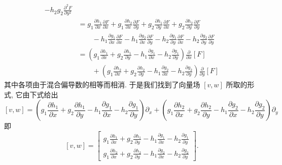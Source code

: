 \begin{align*}
-h_2g_2\frac{\partial^2 F}{\partial y^2}\\
&=g_1\frac{\partial h_1}{\partial x}\frac{\partial F}{\partial x}
+g_1\frac{\partial h_2}{\partial x}\frac{\partial F}{\partial y}
+g_2\frac{\partial h_1}{\partial y}\frac{\partial F}{\partial x}
+g_2\frac{\partial h_2}{\partial y}\frac{\partial F}{\partial y}\\
&\qquad-h_1\frac{\partial g_1}{\partial x}\frac{\partial F}{\partial x}
-h_1\frac{\partial g_2}{\partial x}\frac{\partial F}{\partial y}
-h_2\frac{\partial g_1}{\partial y}\frac{\partial F}{\partial x}
-h_2\frac{\partial g_2}{\partial y}\frac{\partial F}{\partial y}\\
&=\left(g_1\frac{\partial h_1}{\partial x}+g_2\frac{\partial h_1}{\partial y}
-h_1\frac{\partial g_1}{\partial x}-h_2\frac{\partial g_1}{\partial y}\right)\frac{\partial}{\partial x}[F]\\
&\qquad+\left(g_1\frac{\partial h_2}{\partial x}+g_2\frac{\partial h_2}{\partial y}
-h_1\frac{\partial g_2}{\partial x}-h_2\frac{\partial g_2}{\partial y}\right)\frac{\partial}{\partial y}[F]
\end{align*}
其中各项由于混合偏导数的相等而相消. 于是我们找到了向量场 $[v,w]$ 所取的形式, 它由下式给出
\[
[v,w]=\left(g_1\frac{\partial h_1}{\partial x}+g_2\frac{\partial h_1}{\partial y}
-h_1\frac{\partial g_1}{\partial x}-h_2\frac{\partial g_1}{\partial y}\right)\partial_x
+\left(g_1\frac{\partial h_2}{\partial x}+g_2\frac{\partial h_2}{\partial y}
-h_1\frac{\partial g_2}{\partial x}-h_2\frac{\partial g_2}{\partial y}\right)\partial_y
\]
即
\[
[v,w]=
\begin{bmatrix}
g_1\frac{\partial h_1}{\partial x}+g_2\frac{\partial h_1}{\partial y}-h_1\frac{\partial g_1}{\partial x}-h_2\frac{\partial g_1}{\partial y}\\[4pt]
g_1\frac{\partial h_2}{\partial x}+g_2\frac{\partial h_2}{\partial y}-h_1\frac{\partial g_2}{\partial x}-h_2\frac{\partial g_2}{\partial y}
\end{bmatrix}.
\]

